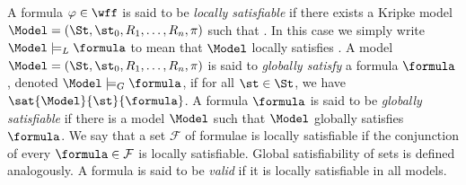 
A formula $\varphi \in \wff$ is said to be \emph{locally satisfiable} if there
exists a Kripke model $\Model = (\St, \st_0, R_1, \ldots, R_n, \pi)$ such that
. In this case we simply write $\Model \models_L
\formula$ to mean that $\Model$ locally satisfies \formula. A model
$\Model = (\St, \st_0, R_1, \ldots, R_n, \pi)$ is said to \emph{globally satisfy}
a formula $\formula$, denoted $\Model \models_G \formula$, if for all $\st \in
\St$, we have $\sat{\Model}{\st}{\formula}$. A formula $\formula$ is said to be
\emph{globally satisfiable} if there is a model $\Model$ such that $\Model$
globally satisfies $\formula$. We say that a set $\mathcal{F}$ of formulae is
locally satisfiable if the conjunction of every $\formula \in \mathcal{F}$ is
locally satisfiable. Global satisfiability of sets is defined analogously. A
formula is said to be \emph{valid} if it is locally satisfiable in all models.

